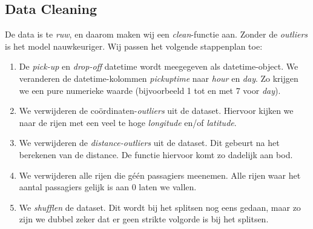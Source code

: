 \documentclass[a4paper,10pt,twoside]{report}
\begin{document}
\pagebreak

\subsection*{Data Cleaning}

De data is te \textit{ruw}, en daarom maken wij een \textit{clean}-functie aan. Zonder de \textit{outliers} is het model nauwkeuriger. Wij passen het volgende stappenplan toe:

\begin{enumerate}
	\item De \textit{pick-up} en \textit{drop-off} datetime wordt meegegeven als datetime-object. We veranderen de datetime-kolommen \textit{pickuptime} naar \textit{hour} en \textit{day}. Zo krijgen we een pure numerieke waarde (bijvoorbeeld 1 tot en met 7 voor \textit{day}).
	\item We verwijderen de coördinaten-\textit{outliers} uit de dataset. Hiervoor kijken we naar de rijen met een veel te hoge \textit{longitude} en/of \textit{latitude}.

	\item We verwijderen de \textit{distance-outliers} uit de dataset. Dit gebeurt na het berekenen van de distance. De functie hiervoor komt zo dadelijk aan bod.
		
	\item We verwijderen alle rijen die géén passagiers meenemen. Alle rijen waar het aantal passagiers gelijk is aan 0 laten we vallen.
	
	\item We \textit{shufflen} de dataset. Dit wordt bij het splitsen nog eens gedaan, maar zo zijn we dubbel zeker dat er geen strikte volgorde is bij het splitsen.
\end{enumerate}
\end{document}

